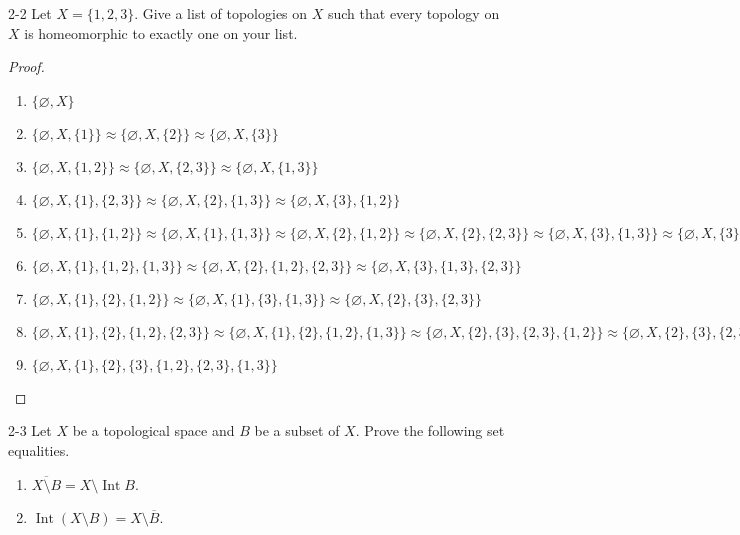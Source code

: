 \begin{problem}{2-2}
Let $X = \{ 1, 2, 3 \}$. Give a list of topologies on $X$ such that every topology on $X$ is homeomorphic to exactly one on your list.
\end{problem}

\begin{proof}
	\begin{enumerate}[label={\arabic*.}]
		\item $\{ \varnothing, X \}$
		\item $\{ \varnothing, X, \{ 1 \} \} \approx \{ \varnothing, X, \{ 2 \} \} \approx \{ \varnothing, X, \{ 3 \} \}$
		\item $\{ \varnothing, X, \{ 1, 2 \} \} \approx \{ \varnothing, X, \{ 2, 3 \} \} \approx \{ \varnothing, X, \{ 1, 3 \} \}$
		\item $\{ \varnothing, X, \{ 1 \}, \{ 2, 3 \} \} \approx \{ \varnothing, X, \{ 2 \}, \{ 1, 3 \} \} \approx \{ \varnothing, X, \{ 3 \}, \{ 1, 2 \} \}$
		\item $\{ \varnothing, X, \{ 1 \}, \{ 1, 2 \} \} \approx \{ \varnothing, X, \{ 1 \}, \{ 1, 3 \} \} \approx \{ \varnothing, X, \{ 2 \}, \{ 1, 2 \} \} \approx \{ \varnothing, X, \{ 2 \}, \{ 2, 3 \} \} \approx \{ \varnothing, X, \{ 3 \}, \{ 1, 3 \} \} \approx \{ \varnothing, X, \{ 3 \}, \{ 2, 3 \} \}$
		\item $\{ \varnothing, X, \{ 1 \}, \{ 1, 2 \}, \{ 1, 3 \} \} \approx \{ \varnothing, X, \{ 2 \}, \{ 1, 2 \}, \{ 2, 3 \} \} \approx \{ \varnothing, X, \{ 3 \}, \{ 1, 3 \}, \{ 2, 3 \} \}$
		\item $\{ \varnothing, X, \{ 1 \}, \{ 2 \}, \{ 1, 2 \} \} \approx \{ \varnothing, X, \{ 1 \}, \{ 3 \}, \{ 1, 3 \} \} \approx \{ \varnothing, X, \{ 2 \}, \{ 3 \}, \{ 2, 3 \} \}$
		\item $\{ \varnothing, X, \{ 1 \}, \{ 2 \}, \{ 1, 2 \}, \{ 2, 3 \} \} \approx \{ \varnothing, X, \{ 1 \}, \{ 2 \}, \{ 1, 2 \}, \{ 1, 3 \} \} \approx \{ \varnothing, X, \{ 2 \}, \{ 3 \}, \{ 2, 3 \}, \{ 1, 2 \} \} \approx \{ \varnothing, X, \{ 2 \}, \{ 3 \}, \{ 2, 3 \}, \{ 1, 3 \} \} \approx \{ \varnothing, X, \{ 1 \}, \{ 3 \}, \{ 1, 3 \}, \{ 2, 3 \} \} \approx \{ \varnothing, X, \{ 1 \}, \{ 3 \}, \{ 1, 2 \}, \{ 1, 3 \} \}$
		\item $\{ \varnothing, X, \{ 1 \}, \{ 2 \}, \{ 3 \}, \{ 1, 2 \}, \{ 2, 3 \}, \{ 1, 3 \} \}$
	\end{enumerate}
\end{proof}

\begin{problem}{2-3}
Let $X$ be a topological space and $B$ be a subset of $X$. Prove the following set equalities.
\begin{enumerate}[label={(\alph*)}]
	\item $\overline{X\setminus B} = X\setminus\operatorname{Int} B$.
	\item $\operatorname{Int}(X\setminus B) = X\setminus \overline{B}$.
\end{enumerate}
\end{problem}

